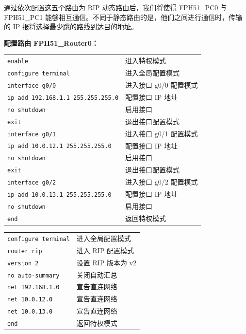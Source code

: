 \documentclass[UTF8,12pt,a4paper]{ctexart}
\begin{document}

通过依次配置这五个路由为 RIP 动态路由后，我们将使得 FPH51\_PC0 与 FPH51\_PC1 能够相互通信。不同于静态路由的是，他们之间进行通信时，传输的 IP 报将选择最少跳的路线到达目的地址。

\noindent\textbf{配置路由 FPH51\_Router0：}

\medskip
\begin{tabular}{p{7cm} p{7cm}}
\texttt{enable} & 进入特权模式 \\
\texttt{configure terminal} & 进入全局配置模式 \\

\texttt{interface g0/0} & 进入接口 g0/0 配置模式 \\
\texttt{ip add 192.168.1.1 255.255.255.0} & 配置接口 IP 地址 \\
\texttt{no shutdown} & 启用接口 \\
\texttt{exit} & 退出接口配置模式 \\

\texttt{interface g0/1} & 进入接口 g0/1 配置模式 \\
\texttt{ip add 10.0.12.1 255.255.255.0} & 配置接口 IP 地址 \\
\texttt{no shutdown} & 启用接口 \\
\texttt{exit} & 退出接口配置模式 \\

\texttt{interface g0/2} & 进入接口 g0/2 配置模式 \\
\texttt{ip add 10.0.13.1 255.255.255.0} & 配置接口 IP 地址 \\
\texttt{no shutdown} & 启用接口 \\

\texttt{end} & 返回特权模式 \\
\end{tabular}

\bigskip
\begin{tabular}{p{7cm} p{7cm}}
\texttt{configure terminal} & 进入全局配置模式 \\
\texttt{router rip} & 进入 RIP 配置模式 \\
\texttt{version 2} & 设置 RIP 版本为 v2 \\
\texttt{no auto-summary} & 关闭自动汇总 \\
\texttt{net 192.168.1.0} & 宣告直连网络 \\
\texttt{net 10.0.12.0} & 宣告直连网络 \\
\texttt{net 10.0.13.0} & 宣告直连网络 \\
\texttt{end} & 返回特权模式 \\
\end{tabular}
\end{document}
